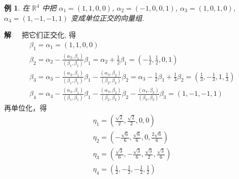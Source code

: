 \documentclass[13pt]{beamer}
\newtheorem{exa}{例}
\def\sol{{\bf 解~~ }}
\def\R{\mathbb{R}}
\begin{document}
\begin{frame}
\begin{exa}
 在 ${\R}^{4}$ 中把 $\alpha_{1}=(1,1,0,0)$, $\alpha_{2}=(-1,0,0,1)$, $\alpha_{3}=(1,0,1,0)$, $\alpha_{4}= (1,-1,-1,1)$ 变成单位正交的向量组. 
\end{exa}
\pause
\sol  把它们正交化, 得 
\[
\begin{array}{l}
\beta_{1}=\alpha_{1}=(1,1,0,0)\\
\beta_{2}=\alpha_{2}-\frac{\left(\alpha_{2}, \beta_{1}\right)}{\left(\beta_{1}, \beta_{1}\right)} \beta_{1}=\alpha_{2}+\frac{1}{2} \beta_{1}=\left(-\frac{1}{2}, \frac{1}{2}, 0,1\right) \\
\beta_{3}=\alpha_{3}-\frac{\left(\alpha_{3}, \beta_{1}\right)}{\left(\beta_{1}, \beta_{1}\right)} \beta_{1}-\frac{\left(\alpha_{3}, \beta_{2}\right)}{\left(\beta_{2}, \beta_{2}\right)} \beta_{2}=\alpha_{3}-\frac{1}{2} \beta_{1}+\frac{1}{3} \beta_{2}=\left(\frac{1}{3},-\frac{1}{3}, 1, \frac{1}{3}\right) \\
\beta_{4}=\alpha_{4}-\frac{\left(\alpha_{4}, \beta_{1}\right)}{\left(\beta_{1}, \beta_{1}\right)} \beta_{1}-\frac{\left(\alpha_{4}, \beta_{2}\right)}{\left(\beta_{2}, \beta_{2}\right)} \beta_{2}-\frac{\left(\alpha_{4}, \beta_{3}\right)}{\left(\beta_{3}, \beta_{3}\right)} \beta_{3}=(1,-1,-1,1)
\end{array}
\]
再单位化，得
\[
\begin{array}{l}
\eta_{1}=\left(\frac{\sqrt{2}}{2}, \frac{\sqrt{2}}{2}, 0,0\right)\\
\eta_{2}=\left(-\frac{\sqrt{6}}{6}, \frac{\sqrt{6}}{6}, 0, \frac{2 \sqrt{6}}{6}\right) \\
\eta_{3}=\left(\frac{\sqrt{3}}{6},-\frac{\sqrt{3}}{6}, \frac{\sqrt{3}}{2}, \frac{\sqrt{3}}{6}\right) \\
\eta_{4}=\left(\frac{1}{2},-\frac{1}{2},-\frac{1}{2}, \frac{1}{2}\right)
\end{array}
\]
\end{frame}
\end{document}
